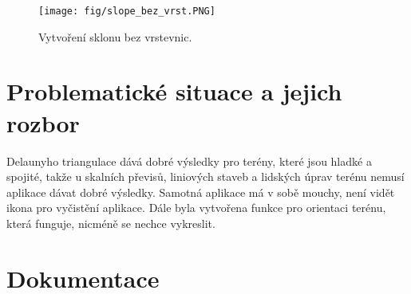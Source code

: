 \documentclass[oneside,12pt,a4paper]{book}
\begin{document}
\begin{figure}[ht!]
    \centering
    \texttt{[image: fig/slope\_bez\_vrst.PNG]}
    \caption{Vytvoření sklonu bez vrstevnic.}
    \label{fig:csv}
\end{figure}

\chapter{Problematické situace a jejich rozbor}
Delaunyho triangulace dává dobré výsledky pro terény, které jsou hladké a spojité, takže u skalních převisů, liniových staveb a lidských úprav terénu nemusí aplikace dávat dobré výsledky. 
Samotná aplikace má v sobě mouchy, není vidět ikona pro vyčistění aplikace. Dále byla vytvořena funkce pro orientaci terénu, která funguje, nicméně se nechce vykreslit.

\chapter{Dokumentace} 
\end{document}
